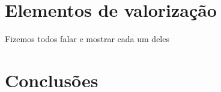 \documentclass[a4paper]{article}
\begin{document}
\section{Elementos de valorização}
Fizemos todos falar e mostrar cada um deles

\section{Conclusões}
\end{document}
